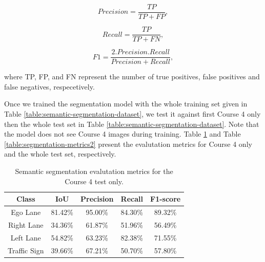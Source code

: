 \begin{equation}
  Precision = \frac{TP}{TP + FP},
  \label{eq:precision}
\end{equation}

\begin{equation}
  Recall = \frac{TP}{TP + FN},
  \label{eq:recall}
\end{equation}

\begin{equation}
  F1 = \frac{2.Precision.Recall}{Precision + Recall},
  \label{eq:F1}
\end{equation}

where TP, FP, and FN represent the number of true positives, false positives
and false negatives, respecetively.

Once we trained the segmentation model with the whole training set given in
Table \ref{table:semantic-segmentation-dataset}, we test it against first
Course 4 only then the whole test set in Table
\ref{table:semantic-segmentation-dataset}. Note that the model does not see
Course 4 images during training. Table \ref{table:segmentation-metrics1} and
Table \ref{table:segmentation-metrics2} present the evalutation metrics for
Course 4 only and the whole test set, respectively.

\begin{table}[h]
  \begin{center}
    \caption{Semantic segmentation evalutation metrics for the Course 4 test only.}
    \label{table:segmentation-metrics1}
    \begin{tabular}{|c|c|c|c|c|}
      \hline
      \textbf{Class} & \textbf{IoU} & \textbf{Precision} & \textbf{Recall} & \textbf{F1-score} \\
      \hline
      Ego Lane       & 81.42\%      & 95.00\%            & 84.30\%         & 89.32\% \\
      \hline
      Right Lane     & 34.36\%      & 61.87\%            & 51.96\%         & 56.49\% \\
      \hline
      Left Lane      & 54.82\%      & 63.23\%            & 82.38\%         & 71.55\% \\
      \hline
      Traffic Sign   & 39.66\%      & 67.21\%            & 50.70\%         & 57.80\% \\
      \hline
    \end{tabular}
  \end{center}
\end{table}

